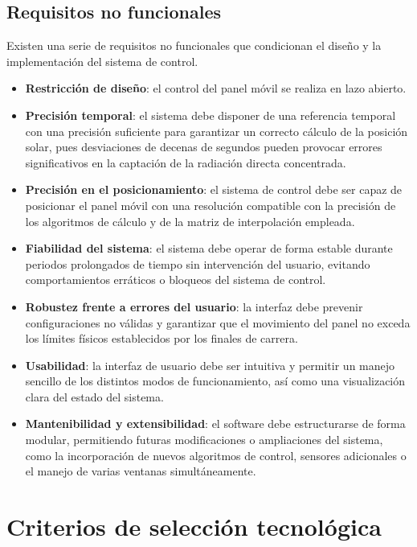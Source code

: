 \subsection{Requisitos no funcionales}

Existen una serie de requisitos no funcionales que condicionan el diseño y la implementación del sistema de control.


\begin{itemize}
	\item \textbf{Restricción de diseño}: el control del panel móvil se realiza en lazo abierto.
	\item \textbf{Precisión temporal}: el sistema debe disponer de una referencia temporal con una precisión suficiente para garantizar un correcto cálculo de la posición solar, pues desviaciones de decenas de segundos pueden provocar errores significativos en la captación de la radiación directa concentrada.	
	\item \textbf{Precisión en el posicionamiento}: el sistema de control debe ser capaz de posicionar el panel móvil con una resolución compatible con la precisión de los algoritmos de cálculo y de la matriz de interpolación empleada.	
	\item \textbf{Fiabilidad del sistema}: el sistema debe operar de forma estable durante periodos prolongados de tiempo sin intervención del usuario, evitando comportamientos erráticos o bloqueos del sistema de control.	
	\item \textbf{Robustez frente a errores del usuario}: la interfaz debe prevenir configuraciones no válidas y garantizar que el movimiento del panel no exceda los límites físicos establecidos por los finales de carrera.	
	\item \textbf{Usabilidad}: la interfaz de usuario debe ser intuitiva y permitir un manejo sencillo de los distintos modos de funcionamiento, así como una visualización clara del estado del sistema.	
	\item \textbf{Mantenibilidad y extensibilidad}: el software debe estructurarse de forma modular, permitiendo futuras modificaciones o ampliaciones del sistema, como la incorporación de nuevos algoritmos de control, sensores adicionales o el manejo de varias ventanas simultáneamente.
\end{itemize}


\section{Criterios de selección tecnológica}

